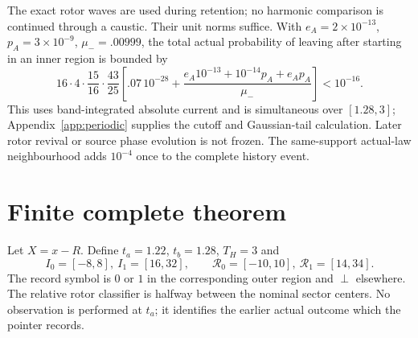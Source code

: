 \documentclass[11pt]{article}
\theoremstyle{definition}\newtheorem{definition}[theorem]{Definition}
\theoremstyle{remark}\newtheorem{remark}[theorem]{Remark}
\begin{document}
The exact rotor waves are used during retention; no harmonic comparison is continued through a caustic. Their unit norms suffice. With $e_A=2\times10^{-13}$, $p_A=3\times10^{-9}$, $\mu_-=.00999$, the total actual probability of leaving after starting in an inner region is bounded by
\[
 16\cdot4\cdot\frac{15}{16}\cdot\frac{43}{25}
 \left[.07\,10^{-28}
 +\frac{e_A10^{-13}+10^{-14}p_A+e_Ap_A}{\mu_-}\right]
 <10^{-16}.
\]
This uses band-integrated absolute current and is simultaneous over $[1.28,3]$;
Appendix~\ref{app:periodic} supplies the cutoff and Gaussian-tail calculation. Later rotor revival or source phase evolution is not frozen. The same-support actual-law neighbourhood adds $10^{-4}$ once to the complete history event.

\section{Finite complete theorem}
Let $X=x-R$. Define $t_a=1.22$, $t_b=1.28$, $T_H=3$ and
\[
 I_0=[-8,8],\ I_1=[16,32],\qquad
 \mathcal R_0=[-10,10],\ \mathcal R_1=[14,34].
\]
The record symbol is $0$ or $1$ in the corresponding outer region and $\perp$ elsewhere. The relative rotor classifier is halfway between the nominal sector centers. No observation is performed at $t_a$; it identifies the earlier actual outcome which the pointer records.
\end{document}

